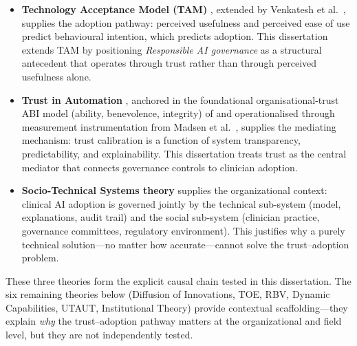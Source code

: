 \begin{itemize}[leftmargin=*, itemsep=2pt]
    \item \textbf{Technology Acceptance Model (TAM)} \cite{davis1989tam}, extended by Venkatesh et al.~\cite{venkatesh2003utaut}, supplies the adoption pathway: perceived usefulness and perceived ease of use predict behavioural intention, which predicts adoption. This dissertation extends TAM by positioning \emph{Responsible AI governance} as a structural antecedent that operates through trust rather than through perceived usefulness alone.
    \item \textbf{Trust in Automation} \cite{lee2004trust}, anchored in the foundational organisational-trust ABI model (ability, benevolence, integrity) of \cite{mayer1995trust} and operationalised through measurement instrumentation from Madsen et al.~\cite{madsen2000measuring}, supplies the mediating mechanism: trust calibration is a function of system transparency, predictability, and explainability. This dissertation treats trust as the central mediator that connects governance controls to clinician adoption.
    \item \textbf{Socio-Technical Systems theory} \cite{cherns1976principles, trist1951some} supplies the organizational context: clinical AI adoption is governed jointly by the technical sub-system (model, explanations, audit trail) and the social sub-system (clinician practice, governance committees, regulatory environment). This justifies why a purely technical solution---no matter how accurate---cannot solve the trust--adoption problem.
\end{itemize}

\noindent These three theories form the explicit causal chain tested in this dissertation. The six remaining theories below (Diffusion of Innovations, TOE, RBV, Dynamic Capabilities, UTAUT, Institutional Theory) provide contextual scaffolding---they explain \emph{why} the trust--adoption pathway matters at the organizational and field level, but they are not independently tested.

